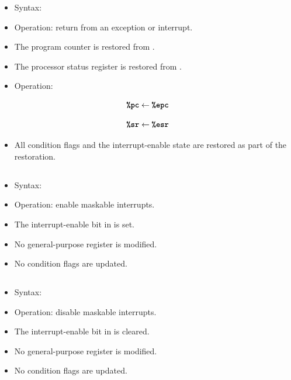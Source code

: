 \begin{itemize}
\item Syntax: 
\item Operation: return from an exception or interrupt.
\item The program counter is restored from .
\item The processor status register is restored from .
\item Operation:
\end{itemize}

$$
\textbf{\texttt{\%pc}} \leftarrow \textbf{\texttt{\%epc}}
$$

$$
\textbf{\texttt{\%sr}} \leftarrow \textbf{\texttt{\%esr}}
$$

\begin{itemize}
\item All condition flags and the interrupt-enable state are restored as part of the
 restoration.
\end{itemize}

\subsection{}

\begin{itemize}
  \item Syntax: 
  \item Operation: enable maskable interrupts.
  \item The interrupt-enable bit in  is set.
  \item No general-purpose register is modified.
  \item No condition flags are updated.
\end{itemize}

\subsection{}

\begin{itemize}
  \item Syntax: 
  \item Operation: disable maskable interrupts.
  \item The interrupt-enable bit in  is cleared.
  \item No general-purpose register is modified.
  \item No condition flags are updated.
\end{itemize}

